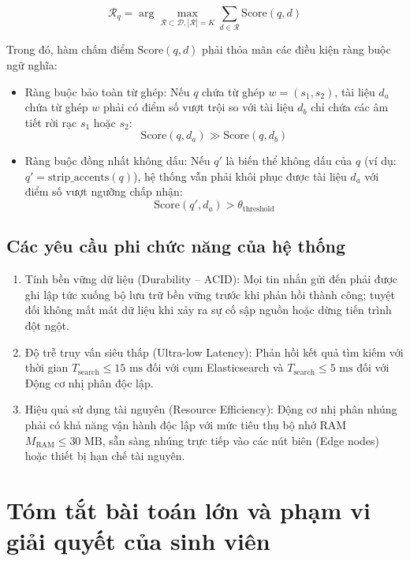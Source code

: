 \documentclass[12pt,a4paper,oneside]{report}
\begin{document}
\begin{equation}
\mathcal{R}_q = \arg\max_{\mathcal{R} \subset \mathcal{D}, |\mathcal{R}|=K} \sum_{d \in \mathcal{R}} \text{Score}(q, d)
\end{equation}

Trong đó, hàm chấm điểm $\text{Score}(q, d)$ phải thỏa mãn các điều kiện ràng buộc ngữ nghĩa:
\begin{itemize}
    \item Ràng buộc bảo toàn từ ghép: Nếu $q$ chứa từ ghép $w = (s_1, s_2)$, tài liệu $d_a$ chứa từ ghép $w$ phải có điểm số vượt trội so với tài liệu $d_b$ chỉ chứa các âm tiết rời rạc $s_1$ hoặc $s_2$:
    \begin{equation}
    \text{Score}(q, d_a) \gg \text{Score}(q, d_b)
    \end{equation}
    \item Ràng buộc đồng nhất không dấu: Nếu $q'$ là biến thể không dấu của $q$ (ví dụ: $q' = \text{strip\_accents}(q)$), hệ thống vẫn phải khôi phục được tài liệu $d_a$ với điểm số vượt ngưỡng chấp nhận:
    \begin{equation}
    \text{Score}(q', d_a) > \theta_{\text{threshold}}
    \end{equation}
\end{itemize}

\subsection{Các yêu cầu phi chức năng của hệ thống}
\begin{enumerate}
    \item Tính bền vững dữ liệu (Durability -- ACID): Mọi tin nhắn gửi đến phải được ghi lập tức xuống bộ lưu trữ bền vững trước khi phản hồi thành công; tuyệt đối không mất mát dữ liệu khi xảy ra sự cố sập nguồn hoặc dừng tiến trình đột ngột.
    \item Độ trễ truy vấn siêu thấp (Ultra-low Latency): Phản hồi kết quả tìm kiếm với thời gian $T_{\text{search}} \le 15\text{ ms}$ đối với cụm Elasticsearch và $T_{\text{search}} \le 5\text{ ms}$ đối với Động cơ nhị phân độc lập.
    \item Hiệu quả sử dụng tài nguyên (Resource Efficiency): Động cơ nhị phân nhúng phải có khả năng vận hành độc lập với mức tiêu thụ bộ nhớ RAM $M_{\text{RAM}} \le 30\text{ MB}$, sẵn sàng nhúng trực tiếp vào các nút biên (Edge nodes) hoặc thiết bị hạn chế tài nguyên.
\end{enumerate}

\section{Tóm tắt bài toán lớn và phạm vi giải quyết của sinh viên}
\end{document}
